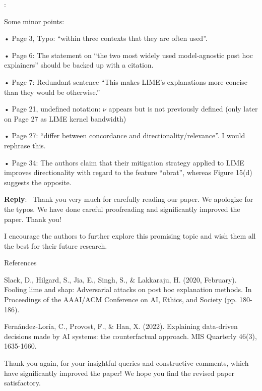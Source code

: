 \documentclass[11pt]{article}
\newcounter{se}[section]
\newcounter{reviewer}
\newcounter{point}[reviewer]
\renewcommand{\thepoint}{R\,\thereviewer.\arabic{point}}
\newenvironment{point}{
    \refstepcounter{point} \bigskip \noindent {\textbf{\thepoint}}: \rmfamily \itshape
}{\medskip}
\newenvironment{point*}{\bigskip \noindent \rmfamily \itshape}{\medskip} %
\newenvironment{reply}
 {\par\medskip \noindent \begin{sf}\textbf{Reply}:\ }
 {\medskip \end{sf}}
\begin{document}
\begin{point}
Some minor points:

• Page 3, Typo: “within three contexts that they are often used”.


• Page 6: The statement on “the two most widely used model-agnostic post hoc explainers” should be backed up with a citation.

• Page 7: Redundant sentence “This makes LIME’s explanations more concise than they would be otherwise.”

• Page 21, undefined notation: $\nu$ appears but is not previously defined (only later on Page 27 as LIME kernel bandwidth)

• Page 27: “differ between concordance and directionality/relevance”. I would rephrase this.

• Page 34: The authors claim that their mitigation strategy applied to LIME improves directionality with regard to the feature “obrat”, whereas Figure 15(d) suggests the opposite.

\end{point}

\begin{reply}
Thank you very much for carefully reading our paper. We apologize for the typos. We have done careful proofreading and significantly improved the paper. Thank you!
\end{reply}

\begin{point*}
I encourage the authors to further explore this promising topic and wish them all the best for their future research.

References

Slack, D., Hilgard, S., Jia, E., Singh, S., \& Lakkaraju, H. (2020, February). Fooling lime and shap: Adversarial attacks on post hoc explanation methods. In Proceedings of the AAAI/ACM Conference on AI, Ethics, and Society (pp. 180-186).

Fernández-Loría, C., Provost, F., \& Han, X. (2022). Explaining data-driven decisions made by AI systems: the counterfactual approach. MIS Quarterly 46(3), 1635-1660.

\end{point*}







\textsf{Thank you again, for your insightful queries and constructive comments,
which have significantly improved the paper! We hope you find the revised paper satisfactory.
}
\end{document}
